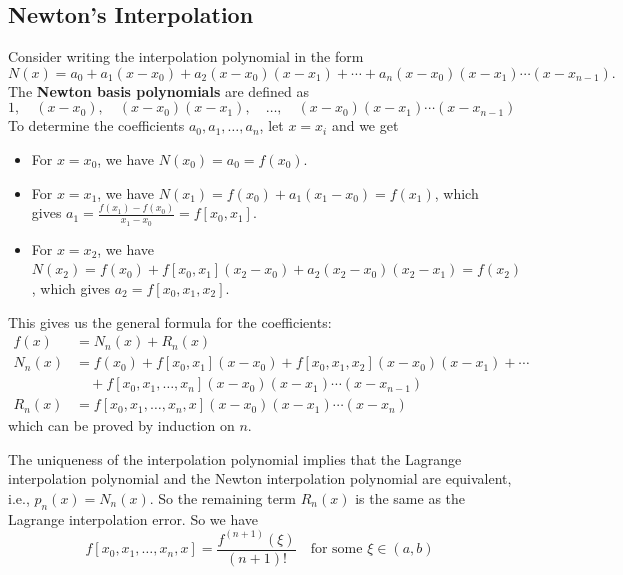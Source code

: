 \documentclass{matharticle}
\begin{document}
\subsection{Newton's Interpolation}
Consider writing the interpolation polynomial in the form
\begin{equation}
	N(x) = a_0 + a_1(x - x_0) + a_2(x - x_0)(x - x_1) + \cdots + a_n(x - x_0)(x - x_1) \cdots (x - x_{n-1}).
\end{equation}
The \textbf{Newton basis polynomials} are defined as
\begin{equation}
	1, \quad (x - x_0), \quad (x - x_0)(x - x_1), \quad \ldots, \quad (x - x_0)(x - x_1) \cdots (x - x_{n-1})
\end{equation}
To determine the coefficients $a_0, a_1, \ldots, a_n$, let $x = x_i$ and we get
\begin{itemize}
	\item For $x = x_0$, we have $N(x_0) = a_0 = f(x_0)$.
	\item For $x = x_1$, we have $N(x_1) = f(x_0) + a_1(x_1 - x_0) = f(x_1)$, which gives $a_1 = \frac{f(x_1) - f(x_0)}{x_1 - x_0} = f[x_0, x_1]$.
	\item For $x = x_2$, we have $N(x_2) = f(x_0) + f[x_0, x_1](x_2 - x_0) + a_2(x_2 - x_0)(x_2 - x_1) = f(x_2)$, which gives $a_2 = f[x_0, x_1, x_2]$.
\end{itemize}
This gives us the general formula for the coefficients:
\begin{equation}
	\begin{aligned}
		f(x)   & = N_n(x) + R_n(x)                                                             \\
		N_n(x) & = f(x_0) + f[x_0, x_1](x - x_0) + f[x_0, x_1, x_2](x - x_0)(x - x_1) + \cdots \\
		       & \quad + f[x_0, x_1, \ldots, x_n](x - x_0)(x - x_1) \cdots (x - x_{n-1})       \\
		R_n(x) & = f[x_0, x_1, \ldots, x_n, x](x - x_0)(x - x_1) \cdots (x - x_n)
	\end{aligned}
\end{equation}
which can be proved by induction on $n$.

The uniqueness of the interpolation polynomial implies that the Lagrange interpolation polynomial and the Newton interpolation polynomial are equivalent, i.e., $p_n(x) = N_n(x)$. So the remaining term $R_n(x)$ is the same as the Lagrange interpolation error. So we have
\begin{equation}
	f[x_0, x_1, \ldots, x_n, x] = \frac{f^{(n+1)}(\xi)}{(n+1)!} \quad \text{for some } \xi \in (a, b)
\end{equation}
\end{document}
